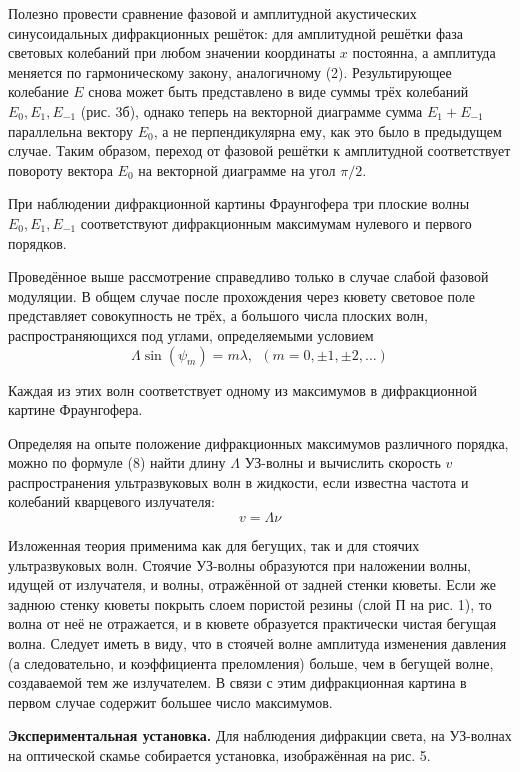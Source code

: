 \documentclass[14pt]{article}
\begin{document}
Полезно провести сравнение фазовой и амплитудной акустических синусоидальных дифракционных решёток: для амплитудной решётки фаза световых колебаний при любом значении координаты $x$ постоянна, а амплитуда меняется по гармоническому закону, аналогичному (2). Результирующее колебание $E$ снова может быть представлено в виде суммы трёх
колебаний $E_0, E_1, E_{-1}$ (рис. 3б), однако теперь на векторной диаграмме сумма $E_1 + E_{-1}$ параллельна вектору $E_0$, а не перпендикулярна ему, как это было в предыдущем случае. Таким образом, переход от фазовой решётки к амплитудной соответствует повороту вектора $E_0$ на векторной диаграмме на угол $\pi/2$.

При наблюдении дифракционной картины Фраунгофера три плоские волны $E_0, E_1, E_{-1}$ соответствуют дифракционным максимумам нулевого и первого порядков.

Проведённое выше рассмотрение справедливо только в случае слабой фазовой модуляции. В общем случае после прохождения через кювету световое поле представляет совокупность не трёх, а большого числа плоских волн, распространяющихся под углами, определяемыми условием
\begin{equation}
	\Lambda\sin(\psi_m) = m\lambda,~~(m = 0, \pm1, \pm2, ...)
\end{equation}

Каждая из этих волн соответствует одному из максимумов в дифракционной картине Фраунгофера.

Определяя на опыте положение дифракционных максимумов различного порядка, можно по формуле (8) найти длину $\Lambda$ УЗ-волны и вычислить скорость $v$ распространения ультразвуковых волн в жидкости, если известна частота и колебаний кварцевого излучателя:
\begin{equation}
	v = \Lambda\nu
\end{equation}

Изложенная теория применима как для бегущих, так и для стоячих ультразвуковых волн. Стоячие УЗ-волны образуются при наложении волны, идущей от излучателя, и волны, отражённой от задней стенки кюветы. Если же заднюю стенку кюветы покрыть слоем пористой резины (слой П на рис. 1), то волна от неё не отражается, и в кювете образуется практически чистая бегущая волна. Следует иметь в виду, что в стоячей волне амплитуда изменения давления (а следовательно, и коэффициента преломления) больше, чем в бегущей волне, создаваемой тем же излучателем. В связи с этим дифракционная картина в первом случае содержит большее число максимумов.


\textbf{Экспериментальная установка.} Для наблюдения дифракции света, на УЗ-волнах на оптической скамье собирается установка, изображённая на рис. 5.
\end{document}
